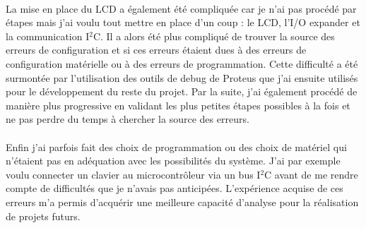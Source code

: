 \documentclass{article}
\begin{document}
    \paragraph{}
    La mise en place du LCD a également été compliquée car je n'ai pas procédé par étapes mais j'ai voulu tout mettre en place d'un coup : le LCD, l'I/O expander et la communication I$^2$C. Il a alors été plus compliqué de trouver la source des erreurs de configuration et si ces erreurs étaient dues à des erreurs de configuration matérielle ou à des erreurs de programmation. Cette difficulté a été surmontée par l'utilisation des outils de debug de Proteus que j'ai ensuite utilisés pour le développement du reste du projet. Par la suite, j'ai également procédé de manière plus progressive en validant les plus petites étapes possibles à la fois et ne pas perdre du temps à chercher la source des erreurs.

    \paragraph{}
    Enfin j'ai parfois fait des choix de programmation ou des choix de matériel qui n'étaient pas en adéquation avec les possibilités du système. J'ai par exemple voulu connecter un clavier au microcontrôleur via un bus I$^2$C avant de me rendre compte de difficultés que je n'avais pas anticipées. L'expérience acquise de ces erreurs m'a permis d'acquérir une meilleure capacité d'analyse pour la réalisation de projets futurs.
\end{document}
